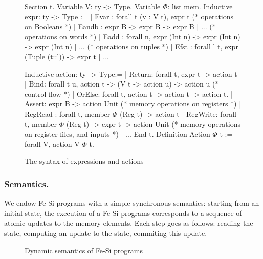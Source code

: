 \documentclass{llncs}
\begin{document}
\begin{figure}
  \centering
\begin{coq}
Section t. 
Variable V: ty -> Type. Variable $\Phi$: list mem. 
Inductive expr: ty -> Type :=
| Evar : forall t (v : V t), expr t
(* operations on Booleans *)
| Eandb : expr B -> expr B -> expr B | ... 
(* operations on words *)
| Eadd : forall n, expr (Int n) -> expr (Int n) -> expr (Int n) | ... 
(* operations on tuples *)
| Efst : forall l t, expr (Tuple (t::l)) -> expr t | ...

Inductive action: ty -> Type:=
| Return: forall t, expr t -> action t
| Bind: forall t u,  action  t -> (V t -> action u) -> action u
(* control-flow *)
| OrElse: forall t, action t -> action t -> action t.
| Assert: expr B -> action Unit    
(* memory operations on registers *)
| RegRead : forall t, member $\Phi$ (Reg t) -> action t
| RegWrite: forall t, member $\Phi$ (Reg t) -> expr t -> action Unit
(* memory operations on register files, and inputs *)
| ... 
End t. 
Definition Action $\Phi$ t := forall V, action V $\Phi$ t.  
\end{coq}
  \caption{The syntax of expressions and actions}
  \label{fig:fesi}
\end{figure}

\subsubsection{Semantics.}
We endow Fe-Si programs with a simple synchronous semantics:  starting
from an initial state, the execution of a Fe-Si programs corresponds
to a sequence of atomic updates to the memory elements. 
%
Each step goes as follows: reading the state, computing an update to
the state, commiting this update.
%

\begin{figure*}
  \centering
\caption{Dynamic semantics of Fe-Si programs}\label{fig:fesi-sem}
\end{figure*}
\end{document}
